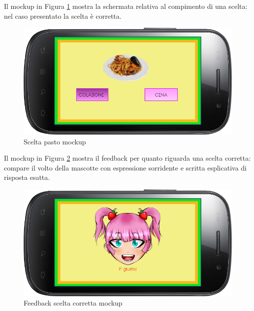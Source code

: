 Il mockup in Figura \ref{fig:Scelta "A tavola!"} mostra la schermata relativa al compimento di una scelta: nel caso presentato la scelta è corretta.
\vspace{70pt}
\begin{figure}[htbp]
\centering
\includegraphics[width=\textwidth]{Images/Mockup/atavolascelta}
\caption{Scelta pasto mockup}
\label{fig:Scelta "A tavola!"}
\end{figure}
\clearpage

Il mockup in Figura \ref{fig:Feedback scelta corretta} mostra il feedback per quanto riguarda una scelta corretta: compare il volto della mascotte con espressione sorridente e scritta esplicativa di risposta esatta.
\vspace{70pt}
\begin{figure}[htbp]
\centering
\includegraphics[width=\textwidth]{Images/Mockup/atavolafeedback}
\caption{Feedback scelta corretta mockup}
\label{fig:Feedback scelta corretta}
\end{figure}
\clearpage